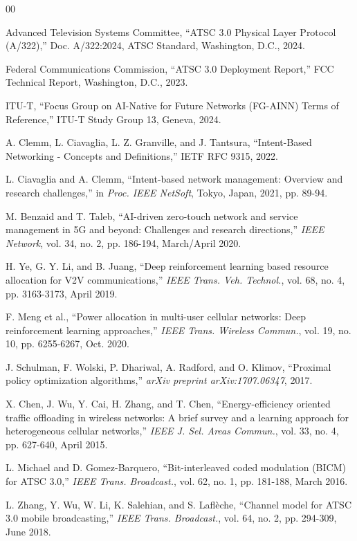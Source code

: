 \documentclass[conference]{IEEEtran}
\begin{document}
\begin{thebibliography}{00}

 Advanced Television Systems Committee, ``ATSC 3.0 Physical Layer Protocol (A/322),'' Doc. A/322:2024, ATSC Standard, Washington, D.C., 2024.

 Federal Communications Commission, ``ATSC 3.0 Deployment Report,'' FCC Technical Report, Washington, D.C., 2023.

 ITU-T, ``Focus Group on AI-Native for Future Networks (FG-AINN) Terms of Reference,'' ITU-T Study Group 13, Geneva, 2024.

 A. Clemm, L. Ciavaglia, L. Z. Granville, and J. Tantsura, ``Intent-Based Networking - Concepts and Definitions,'' IETF RFC 9315, 2022.

 L. Ciavaglia and A. Clemm, ``Intent-based network management: Overview and research challenges,'' in \textit{Proc. IEEE NetSoft}, Tokyo, Japan, 2021, pp. 89-94.

 M. Benzaid and T. Taleb, ``AI-driven zero-touch network and service management in 5G and beyond: Challenges and research directions,'' \textit{IEEE Network}, vol. 34, no. 2, pp. 186-194, March/April 2020.

 H. Ye, G. Y. Li, and B. Juang, ``Deep reinforcement learning based resource allocation for V2V communications,'' \textit{IEEE Trans. Veh. Technol.}, vol. 68, no. 4, pp. 3163-3173, April 2019.

 F. Meng et al., ``Power allocation in multi-user cellular networks: Deep reinforcement learning approaches,'' \textit{IEEE Trans. Wireless Commun.}, vol. 19, no. 10, pp. 6255-6267, Oct. 2020.

 J. Schulman, F. Wolski, P. Dhariwal, A. Radford, and O. Klimov, ``Proximal policy optimization algorithms,'' \textit{arXiv preprint arXiv:1707.06347}, 2017.

 X. Chen, J. Wu, Y. Cai, H. Zhang, and T. Chen, ``Energy-efficiency oriented traffic offloading in wireless networks: A brief survey and a learning approach for heterogeneous cellular networks,'' \textit{IEEE J. Sel. Areas Commun.}, vol. 33, no. 4, pp. 627-640, April 2015.

 L. Michael and D. Gomez-Barquero, ``Bit-interleaved coded modulation (BICM) for ATSC 3.0,'' \textit{IEEE Trans. Broadcast.}, vol. 62, no. 1, pp. 181-188, March 2016.

 L. Zhang, Y. Wu, W. Li, K. Salehian, and S. Laflèche, ``Channel model for ATSC 3.0 mobile broadcasting,'' \textit{IEEE Trans. Broadcast.}, vol. 64, no. 2, pp. 294-309, June 2018.


\end{thebibliography}
\end{document}
